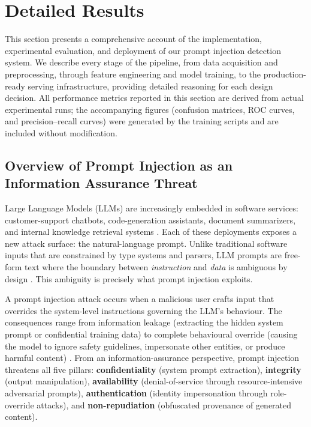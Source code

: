 \documentclass[12pt, letterpaper]{article}   %
\begin{document}
\section{Detailed Results}

This section presents a comprehensive account of the implementation, experimental evaluation, and deployment of our prompt injection detection system. We describe every stage of the pipeline, from data acquisition and preprocessing, through feature engineering and model training, to the production-ready serving infrastructure, providing detailed reasoning for each design decision. All performance metrics reported in this section are derived from actual experimental runs; the accompanying figures (confusion matrices, ROC curves, and precision--recall curves) were generated by the training scripts and are included without modification.

\subsection{Overview of Prompt Injection as an Information Assurance Threat}

Large Language Models (LLMs) are increasingly embedded in software services: customer-support chatbots, code-generation assistants, document summarizers, and internal knowledge retrieval systems \cite{ref5}\cite{ref24}. Each of these deployments exposes a new attack surface: the natural-language prompt. Unlike traditional software inputs that are constrained by type systems and parsers, LLM prompts are free-form text where the boundary between \textit{instruction} and \textit{data} is ambiguous by design \cite{ref20}. This ambiguity is precisely what prompt injection exploits.

A prompt injection attack occurs when a malicious user crafts input that overrides the system-level instructions governing the LLM's behaviour. The consequences range from information leakage (extracting the hidden system prompt or confidential training data) to complete behavioural override (causing the model to ignore safety guidelines, impersonate other entities, or produce harmful content) \cite{ref4}\cite{ref26}. From an information-assurance perspective, prompt injection threatens all five pillars: \textbf{confidentiality} (system prompt extraction), \textbf{integrity} (output manipulation), \textbf{availability} (denial-of-service through resource-intensive adversarial prompts), \textbf{authentication} (identity impersonation through role-override attacks), and \textbf{non-repudiation} (obfuscated provenance of generated content).
\end{document}

